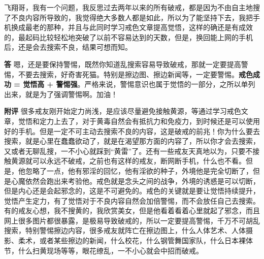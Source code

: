 \begin{case}
    飞翔哥，我有一个问题，我反思过去两年以来的所有破戒，都是因为不由自主地搜了不良内容所导致的，我觉得绝大多数人都是如此，所以为了能坚持下去，我把手机换成最老的那种，并且与此同时学习戒色文章提高觉悟，这样的确还是有成效的，最起码比较轻松地突破了以前不容易达到的天数，但是，换回能上网的手机后，还是会去搜索不良，结果可想而知。

    \textbf{答} 嗯，还是要保持警惕，既然你知道乱搜索容易导致破戒，那就一定要提高警惕，不要去搜索，好奇害死猫。特别是擦边图、擦边新闻等，一定要警惕。\textbf{戒色成功 = 觉悟高 + 警惕强}。严格来说，警惕意识也属于觉悟的一部分，之所以单列出来，就是为了强调警惕啊。加油！

    \textbf{附评} 很多戒友刚开始定力尚浅，是应该尽量避免接触黄源，等通过学习戒色文章，觉悟和定力上去了，对于黄毒自然会有抵抗力和免疫力，到时候还是可以使用好的手机。但是一定不可主动去搜索不良的内容，这是破戒的前兆！你为什么要去搜索，就是心里在蠢蠢欲动了，就是在渴望那方面的内容了，所以你才会去搜索，又或者无聊乱搜，一不小心就踩到“黄雷”了。还有一些戒友天真地以为，只要不接触黄源就可以永远不破戒，之前也有这样的戒友，断网断手机，什么也不看。但是，他忽略了一点，他有邪淫的回忆，他有淫欲的种子，外境他是完全切断了，但是心魔依然会跑出来考验他。戒色就是念头之间的战争，外境的诱惑是可以切断，但是内心还是会起邪念的，这是不可避免的。戒色的关键就是要让觉悟持续提升，觉悟产生定力，有了觉悟对于不良内容自然会加倍警惕，而不会放任自己去搜索。有的戒友心想，我不搜黄的，我欣赏美女，但是他看着看着心里就起了邪念，而且网上很多图片都很暴露，是极易导致破戒的，所以一定要提高警惕，千万不可胡乱搜索，特别警惕擦边内容，很多戒友就阵亡在擦边图上，什么人体艺术、人体摄影、柔术，或者某些擦边的新闻，什么校花，什么钢管舞国家队，什么日本裸体节，什么扫黄现场等等，眼花缭乱，一不小心就会中招而破戒。
\end{case}

